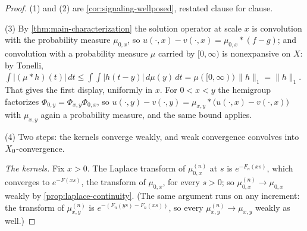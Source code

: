 \begin{proof}
(1) and (2) are \ref{cor:signaling-wellposed}, restated clause for clause.

(3) By \ref{thm:main-characterization} the solution operator at scale $x$ is convolution
with the probability measure $\mu_{0,x}$, so $u(\cdot,x) - v(\cdot,x) = \mu_{0,x}*(f-g)$;
and convolution with a probability measure $\mu$ carried by $[0,\infty)$ is nonexpansive on
$X$: by Tonelli,
$\int |(\mu * h)(t)|\,dt \le \int\!\!\int |h(t-y)|\,d\mu(y)\,dt = \mu([0,\infty))\,\|h\|_1
= \|h\|_1$. That gives the first display, uniformly in $x$. For $0 < x < y$ the hemigroup
factorizes $\Phi_{0,y} = \Phi_{x,y}\Phi_{0,x}$, so
$u(\cdot,y) - v(\cdot,y) = \mu_{x,y} * \bigl(u(\cdot,x) - v(\cdot,x)\bigr)$ with $\mu_{x,y}$
again a probability measure, and the same bound applies.

(4) Two steps: the kernels converge weakly, and weak convergence convolves into
$X_0$-convergence.

\emph{The kernels.} Fix $x > 0$. The Laplace transform of $\mu^{(n)}_{0,x}$ at $s$ is
$e^{-F_n(xs)}$, which converges to $e^{-F(xs)}$, the transform of $\mu_{0,x}$, for every
$s > 0$; so $\mu^{(n)}_{0,x} \to \mu_{0,x}$ weakly by \ref{prop:laplace-continuity}. (The
same argument runs on any increment: the transform of $\mu^{(n)}_{x,y}$ is
$e^{-(F_n(ys) - F_n(xs))}$, so every $\mu^{(n)}_{x,y} \to \mu_{x,y}$ weakly as well.)


\end{proof}
